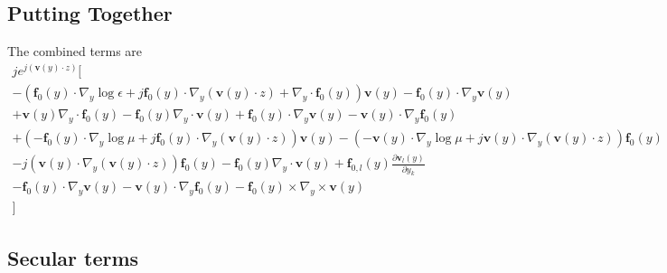 \documentclass{article}
\theoremstyle{plain}
\begin{document}
\subsection{Putting Together}

The combined terms are
\begin{multline}
	je^{j\left(\mathbf{v}(y)\cdot z\right)}\Big[ \\
		-\left( \mathbf{f}_0(y)\cdot\nabla_y\log{\epsilon} + j\mathbf{f}_0(y)\cdot\nabla_y(\mathbf{v}(y)\cdot z) + \nabla_y\cdot\mathbf{f}_0(y) \right)\mathbf{v}(y) - \mathbf{f}_0(y)\cdot\nabla_y\mathbf{v}(y) \\
		+ \mathbf{v}(y)\nabla_y\cdot\mathbf{f}_0(y) - \mathbf{f}_0(y)\nabla_y\cdot\mathbf{v}(y) + \mathbf{f}_0(y)\cdot\nabla_y\mathbf{v}(y) - \mathbf{v}(y)\cdot\nabla_y\mathbf{f}_0(y) \\ + \left( -\mathbf{f}_0(y)\cdot\nabla_y\log{\mu} + j\mathbf{f}_0(y)\cdot\nabla_y(\mathbf{v}(y)\cdot z) \right)\mathbf{v}(y) - \left( -\mathbf{v}(y)\cdot\nabla_y\log{\mu} + j\mathbf{v}(y)\cdot\nabla_y(\mathbf{v}(y)\cdot z) \right)\mathbf{f}_0(y) \\
		-j(\mathbf{v}(y)\cdot\nabla_y(\mathbf{v}(y)\cdot z))\mathbf{f}_0(y) -\mathbf{f}_0(y)\nabla_y\cdot\mathbf{v}(y) + \mathbf{f}_{0,l}(y)\frac{\partial\mathbf{v}_l(y)}{\partial y_k} \\ - \mathbf{f}_0(y)\cdot\nabla_y\mathbf{v}(y) - \mathbf{v}(y)\cdot\nabla_y\mathbf{f}_0(y) - \mathbf{f}_0(y)\times\nabla_y\times\mathbf{v}(y)
	\\ \Big]
\end{multline}


\subsection{Secular terms}
\end{document}
